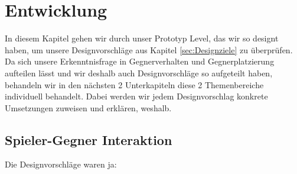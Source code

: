 \documentclass[../Main.tex]{subfiles}
\begin{document}
\section{Entwicklung} \label{sec:Entwicklung}
In diesem Kapitel gehen wir durch unser Prototyp Level, das wir so designt haben, um unsere Designvorschläge aus Kapitel \ref{sec:Designziele} zu überprüfen. Da sich unsere Erkenntnisfrage in Gegnerverhalten und Gegnerplatzierung aufteilen lässt und wir deshalb auch Designvorschläge so aufgeteilt haben, behandeln wir in den nächsten 2 Unterkapiteln diese 2 Themenbereiche individuell behandelt. Dabei werden wir jedem Designvorschlag konkrete Umsetzungen zuweisen und erklären, weshalb.

\subsection{Spieler-Gegner Interaktion}
Die Designvorschläge waren ja:
\end{document}
